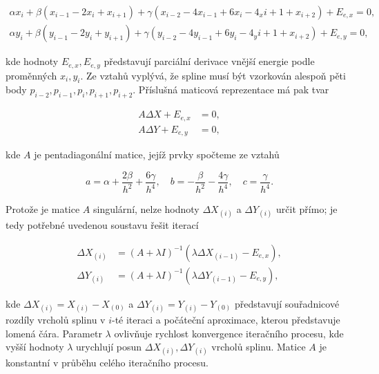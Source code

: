 \begin{equation*}\begin{split}
    \alpha x_i + \beta(x_{i-1} - 2x_i + x_{i+1}) + \gamma( x_{i-2} - 4x_{i-1} + 6x_i - 4_x{i+1} + x_{i+2}) + E_{e, x} = 0,\\
    \alpha y_i + \beta(y_{i-1} - 2y_i + y_{i+1}) + \gamma( y_{i-2} - 4y_{i-1} + 6y_i - 4_y{i+1} + x_{i+2}) + E_{e, y} = 0,
\end{split}
\end{equation*}
\par kde hodnoty $E_{e,x}, E_{e,y}$ představují parciální derivace vnější energie podle proměnných $x_i, y_i$. Ze vztahů vyplývá, že spline musí být vzorkován alespoň pěti body $p_{i-2}, p_{i-1}, p_{i}, p_{i+1}, p_{i+2}$. Příslušná maticová reprezentace má pak tvar

\begin{equation*}\begin{split}
    A \Delta X + E_{e, x} &= 0,  \\
    A \Delta Y + E_{e, y} &= 0,
\end{split}
\end{equation*}
\par kde $A$ je pentadiagonální matice, jejíž prvky spočteme ze vztahů

\begin{equation*}
    a = \alpha + \frac{2 \beta}{h^2} + \frac{6 \gamma}{h^4}, \quad b = - \frac{\beta}{h^2} - \frac{4 \gamma}{h^4}, \quad c = \frac{\gamma}{h^4}.
\end{equation*}
\par Protože je matice $A$ singulární, nelze hodnoty $\Delta X_{(i)}$ a $\Delta Y_{(i)}$ určit přímo; je tedy potřebné uvedenou soustavu řešit iterací 

\begin{equation*}\begin{split}
    \Delta X_{(i)} &= (A + \lambda I)^{-1} (\lambda \Delta X_{(i-1)} - E_{e, x}), \\
    \Delta Y_{(i)} &= (A + \lambda I)^{-1} (\lambda \Delta Y_{(i-1)} - E_{e, y}),
\end{split}
\end{equation*}
\par kde $\Delta X_{(i)} = X_{(i)} - X_{(0)}$ a $\Delta Y_{(i)} = Y_{(i)} - Y_{(0)}$ představují souřadnicové rozdíly vrcholů splinu v $i$-té iteraci a počáteční aproximace, kterou představuje lomená čára. Parametr $\lambda$ ovlivňuje rychlost konvergence iteračního procesu, kde vyšší hodnoty $\lambda$ urychlují posun $\Delta X_{(i)}, \Delta Y_{(i)}$ vrcholů splinu. Matice $A$ je konstantní v průběhu celého iteračního procesu.
\newpage
